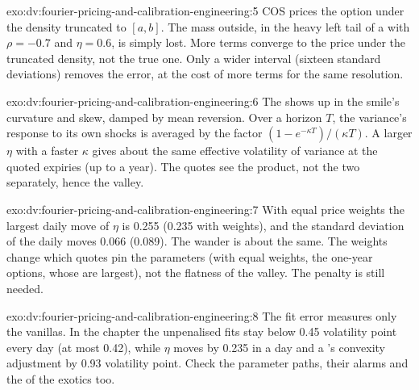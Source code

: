 \begin{solution}{exo:dv:fourier-pricing-and-calibration-engineering:5}
COS prices the option under the density truncated to $[a,b]$. The mass outside, in the heavy left tail of a  with $\rho=-0.7$ and
$\eta=0.6$, is simply lost. More terms converge to the price under the truncated density, not the true one. Only a wider interval (sixteen
standard deviations) removes the error, at the cost of more terms for the same resolution.
\end{solution}

\begin{solution}{exo:dv:fourier-pricing-and-calibration-engineering:6}
The  shows up in the smile's curvature and skew, damped by mean reversion. Over a horizon $T$, the variance's response to
its own shocks is averaged by the factor $(1-e^{-\kappa T})/(\kappa T)$. A larger $\eta$ with a faster $\kappa$ gives about the same effective
volatility of variance at the quoted expiries (up to a year). The quotes see the product, not the two separately, hence the valley.
\end{solution}

\begin{solution}{exo:dv:fourier-pricing-and-calibration-engineering:7}
With equal price weights the largest daily move of $\eta$ is 0.255 (0.235 with  weights), and the standard deviation of the daily moves 0.066
(0.089). The wander is about the same. The weights change which quotes pin the parameters (with equal weights, the one-year options, whose 
are largest), not the flatness of the valley. The penalty is still needed.
\end{solution}

\begin{solution}{exo:dv:fourier-pricing-and-calibration-engineering:8}
The fit error measures only the vanillas. In the chapter the unpenalised fits stay below 0.45 volatility point every day (at most 0.42), while
$\eta$ moves by 0.235 in a day and a 's convexity adjustment by 0.93 volatility point. Check the parameter paths, their alarms and
the  of the exotics too.
\end{solution}

